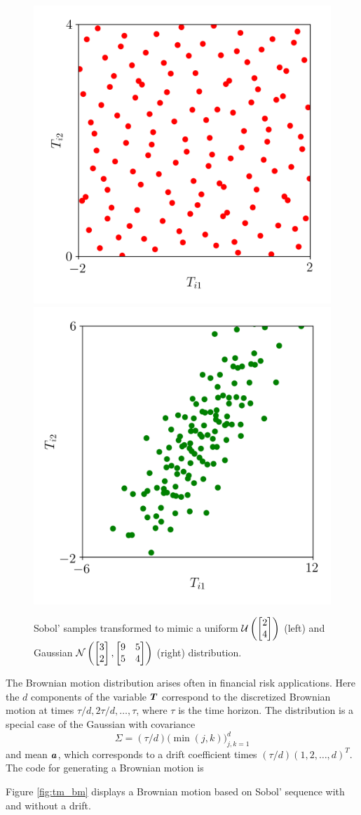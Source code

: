 \documentclass[graybox,footinfo]{svmult}
\newcommand{\mSigma}{\mathsf{\Sigma}}
\begin{document}
\begin{figure}[t]
	\includegraphics[width=.45\textwidth]{QMCSoftwareArticle/figs/tm_uniform.png} 
	\includegraphics[width=.45\textwidth]{QMCSoftwareArticle/figs/tm_gaussian.png}
	\caption{Sobol' samples transformed to mimic a uniform ${\mathcal{U}}\left( \begin{bmatrix} 2 \\ 4 \end{bmatrix} \right)$ (left) and  Gaussian ${\mathcal{N}}\left(\begin{bmatrix} 3 \\ 2 \end{bmatrix}, \begin{bmatrix} 9 & 5 \\ 5 & 4 \end{bmatrix} \right)$ (right) distribution.}
	\label{fig:tm_ug}
\end{figure}

The Brownian motion distribution arises often in financial risk applications.  Here the $d$ components of the variable ${\boldsymbol{T}}$ correspond to the discretized Brownian motion at times $\tau/d, 2\tau/d, \ldots, \tau$, where $\tau$ is the time horizon.  The distribution is a special case of the Gaussian with covariance 
\begin{equation} \label{eq:BMcov}
	\mSigma = (\tau/d) \bigl (\min(j,k) \bigr)_{j,k=1}^d
\end{equation}
and mean ${\boldsymbol{a}}$, which  corresponds to a drift coefficient times $(\tau/d)(1, 2, \ldots, d)^T$. The code for generating a Brownian motion is

Figure \ref{fig:tm_bm} displays a Brownian motion based on Sobol' sequence with and without a drift.
\end{document}
